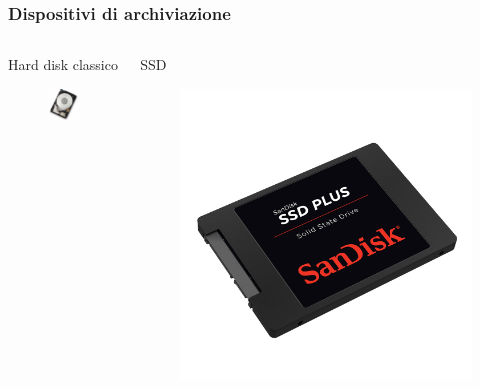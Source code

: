 \documentclass[handout]{beamer}
\begin{document}
\begin{frame}
\frametitle{Dispositivi di archiviazione}
\begin{columns}
\begin{column}{.3\textwidth}
  \begin{center}
    Hard disk classico
    \begin{figure}
      \includegraphics[width=\columnwidth]{img/hdd.jpg}
    \end{figure}
  \end{center}
\end{column}
\begin{column}{.3\textwidth}
  \begin{center}
    SSD
    \begin{figure}
      \includegraphics[width=\columnwidth]{img/ssd.png}

\end{figure}
\end{center}
\end{column}
\end{columns}
\end{frame}
\end{document}
